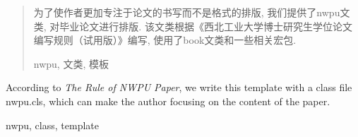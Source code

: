 %

\begin{abstract}
    为了使作者更加专注于论文的书写而不是格式的排版, 我们提供了nwpu文类, 对毕业论文进行排版. 该文类根据《西北工业大学博士研究生学位论文编写规则（试用版）》编写, 使用了book文类和一些相关宏包.
    \begin{keyword}
        nwpu,  文类, 模板
    \end{keyword}
\end{abstract}

\begin{abstractE}
    According to {\it The Rule of NWPU Paper}, we write this template with a class file nwpu.cls, which can make the author focusing on the content of the paper.
    \begin{keywordE}
        nwpu, class, template
    \end{keywordE}
\end{abstractE}
